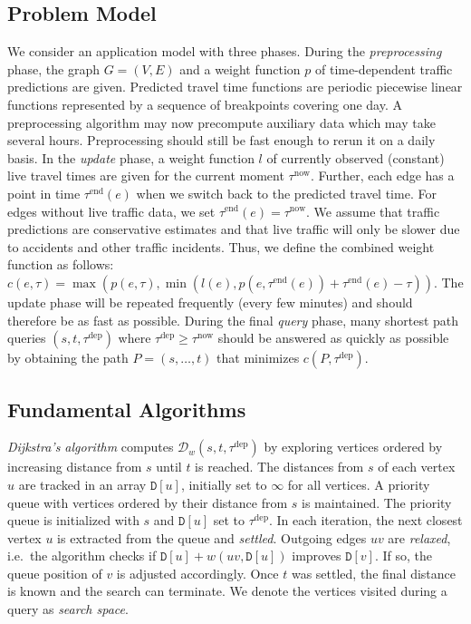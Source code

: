\documentclass[a4paper,UKenglish,cleveref, autoref, thm-restate,anonymous]{lipics-v2021}
\newcommand*{\pred}{p}
\newcommand*{\comb}{c}
\newcommand*{\dist}{\mathcal{D}}
\newcommand*{\tdep}{\tau^{\operatorname{dep}}}
\begin{document}
\subsection{Problem Model}

We consider an application model with three phases.
During the \emph{preprocessing} phase, the graph $G=(V,E)$ and a weight function $\pred$ of time-dependent traffic predictions are given.
Predicted travel time functions are periodic piecewise linear functions represented by a sequence of breakpoints covering one day.
A preprocessing algorithm may now precompute auxiliary data which may take several hours.
Preprocessing should still be fast enough to rerun it on a daily basis.
In the \emph{update} phase, a weight function $l$ of currently observed (constant) live travel times are given for the current moment $\tau^{\operatorname{now}}$.
Further, each edge has a point in time $\tau^{\operatorname{end}}(e)$ when we switch back to the predicted travel time.
For edges without live traffic data, we set $\tau^{\operatorname{end}}(e) = \tau^{\operatorname{now}}$.
We assume that traffic predictions are conservative estimates and that live traffic will only be slower due to accidents and other traffic incidents.
Thus, we define the combined weight function as follows:
$\comb(e, \tau) = \max(\pred(e, \tau), \min(l(e), \pred(e, \tau^{\operatorname{end}}(e)) + \tau^{\operatorname{end}}(e) - \tau))$.
The update phase will be repeated frequently (every few minutes) and should therefore be as fast as possible.
During the final \emph{query} phase, many shortest path queries $(s,t,\tdep)$ where $\tdep \geq \tau^{\operatorname{now}}$ should be answered as quickly as possible by obtaining the path $P = (s,\dots,t)$ that minimizes $\comb(P, \tdep)$.

\subsection{Fundamental Algorithms}

\emph{Dijkstra's algorithm} computes $\dist_w(s,t,\tdep)$ by exploring vertices ordered by increasing distance from $s$ until $t$ is reached.
The distances from $s$ of each vertex $u$ are tracked in an array $\mathtt{D}[u]$, initially set to $\infty$ for all vertices.
A priority queue with vertices ordered by their distance from $s$ is maintained.
The priority queue is initialized with $s$ and $\mathtt{D}[u]$ set to $\tdep$.
In each iteration, the next closest vertex $u$ is extracted from the queue and \emph{settled}.
Outgoing edges $uv$ are \emph{relaxed}, i.e.\ the algorithm checks if $\mathtt{D}[u] + w(uv, \mathtt{D}[u])$ improves $\mathtt{D}[v]$.
If so, the queue position of $v$ is adjusted accordingly.
Once $t$ was settled, the final distance is known and the search can terminate.
We denote the vertices visited during a query as \emph{search space}.
\end{document}

